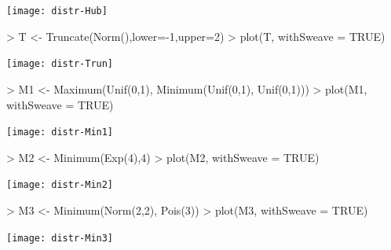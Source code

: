 \documentclass[11pt]{article}
\begin{document}
\begin{Schunk}
\end{Schunk}
\texttt{[image: distr-Hub]}
\begin{Schunk}
\begin{Sinput}
> T <- Truncate(Norm(),lower=-1,upper=2)
> plot(T, withSweave = TRUE)
\end{Sinput}
\end{Schunk}
\texttt{[image: distr-Trun]}
\begin{Schunk}
\begin{Sinput}
> M1 <- Maximum(Unif(0,1), Minimum(Unif(0,1), Unif(0,1)))
> plot(M1, withSweave = TRUE)
\end{Sinput}
\end{Schunk}
\texttt{[image: distr-Min1]}
\begin{Schunk}
\begin{Sinput}
> M2 <- Minimum(Exp(4),4)
> plot(M2, withSweave = TRUE)
\end{Sinput}
\end{Schunk}
\texttt{[image: distr-Min2]}
\begin{Schunk}
\begin{Sinput}
> M3 <- Minimum(Norm(2,2), Pois(3))
> plot(M3, withSweave = TRUE)
\end{Sinput}
\end{Schunk}
\texttt{[image: distr-Min3]}
%

\end{document}
\end{Sinput}
\end{Schunk}
\end{document}
